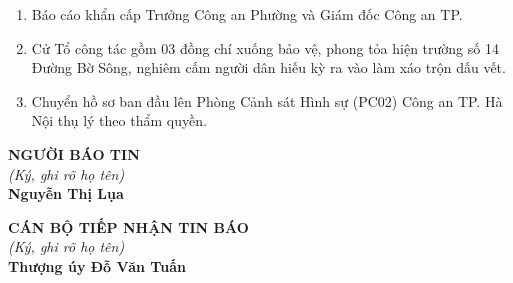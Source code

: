 \documentclass[12pt,a4paper]{article}
\begin{document}
\begin{enumerate}[label=\arabic*., leftmargin=*, itemsep=2pt, topsep=2pt, parsep=0pt]
  \item Báo cáo khẩn cấp Trưởng Công an Phường và Giám đốc Công an TP.
  \item Cử Tổ công tác gồm 03 đồng chí xuống bảo vệ, phong tỏa hiện trường số 14 Đường Bờ Sông, nghiêm cấm người dân hiếu kỳ ra vào làm xáo trộn dấu vết.
  \item Chuyển hồ sơ ban đầu lên Phòng Cảnh sát Hình sự (PC02) Công an TP. Hà Nội thụ lý theo thẩm quyền.
\end{enumerate}
\vspace{0.8cm}
\noindent
\begin{minipage}[t]{0.48\textwidth}
    \begin{center}
        \textbf{NGƯỜI BÁO TIN}\\[0.1cm]
        \textit{(Ký, ghi rõ họ tên)}\\[1.6cm]
        \textbf{Nguyễn Thị Lụa}
    \end{center}
\end{minipage}
\hfill
\begin{minipage}[t]{0.48\textwidth}
    \begin{center}
        \textbf{CÁN BỘ TIẾP NHẬN TIN BÁO}\\[0.1cm]
        \textit{(Ký, ghi rõ họ tên)}\\[1.6cm]
        \textbf{Thượng úy Đỗ Văn Tuấn}
    \end{center}
\end{minipage}
\end{document}

